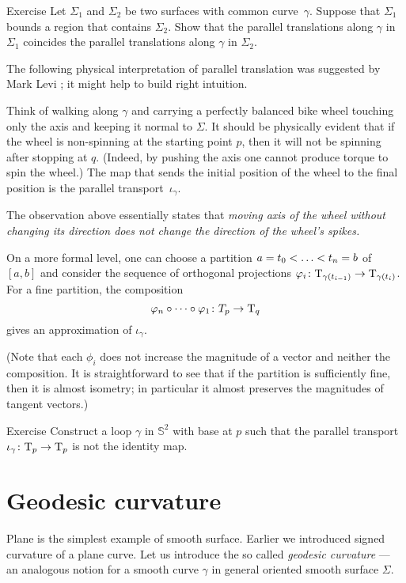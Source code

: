 \begin{thm}{Exercise}\label{ex:parallel-transport-support}
Let $\Sigma_1$ and $\Sigma_2$ be two surfaces with common curve~$\gamma$.
Suppose that $\Sigma_1$ bounds a region that contains $\Sigma_2$.
Show that the parallel translations along $\gamma$ in $\Sigma_1$ 
coincides the parallel translations along $\gamma$ in $\Sigma_2$. 
\end{thm}

The following physical interpretation of parallel translation was suggested by Mark Levi \cite{levi};
it might help to build right intuition.

Think of walking along $\gamma$ and carrying a perfectly balanced bike wheel touching only the axis and keeping it normal to $\Sigma$.
It should be physically evident that if the wheel is non-spinning at the starting point $p$, then it will not be spinning after stopping at $q$.
(Indeed, by pushing the axis one cannot produce torque to spin the wheel.)
The map that sends the initial position of the wheel to the final position is  the parallel transport~$\iota_\gamma$.

The observation above essentially states that {}\emph{moving axis of the wheel without changing its direction does not change the direction of the wheel's spikes.}

On a more formal level, one can choose a partition $a=t_0<\dots\z<t_n=b$ of $[a,b]$
and consider the sequence of orthogonal projections $\varphi_i\colon\mathrm{T}_{\gamma(t_{i-1})}\to\mathrm{T}_{\gamma(t_i)}$.
For a fine partition, the composition 
\[\phi_n\circ\dots\circ\phi_1\:T_p\z\to\T_q\]
gives an approximation of $\iota_\gamma$.

(Note that each $\phi_i$ does not increase the magnitude of a vector and neither the composition.
It is straightforward to see that if the partition is sufficiently fine, then it is almost isometry; in particular it almost preserves the magnitudes of tangent vectors.)

\begin{thm}{Exercise}\label{ex:holonomy=not0}
Construct a loop $\gamma$ in $\mathbb{S}^2$ with base at $p$ such that the parallel transport $\iota_\gamma\colon\mathrm{T}_p\to\mathrm{T}_p$ is not the identity map.
\end{thm}

\section{Geodesic curvature}

Plane is the simplest example of smooth surface.
Earlier we introduced signed curvature of a plane curve.
Let us introduce the so called \emph{geodesic curvature} --- an analogous notion for a smooth curve $\gamma$ in general oriented smooth surface $\Sigma$.


